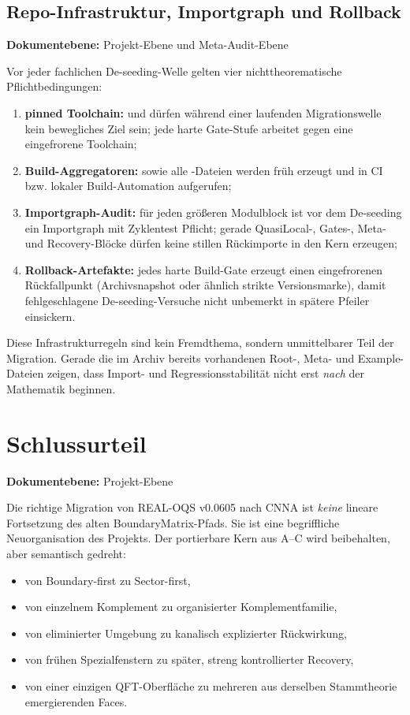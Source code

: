 \documentclass[11pt,a4paper]{article}
\let\oldpath\path
\renewcommand{\path}[1]{\oldpath{#1}}
\newcommand{\doclevel}[1]{\par\small\noindent\textbf{Dokumentebene:} #1\par\normalsize\medskip}
\begin{document}
\subsection{Repo-Infrastruktur, Importgraph und Rollback}
\doclevel{Projekt-Ebene und Meta-Audit-Ebene}
Vor jeder fachlichen De-seeding-Welle gelten vier nichttheorematische Pflichtbedingungen:

\begin{enumerate}
\item \textbf{pinned Toolchain:}  und  dürfen während einer
laufenden Migrationswelle kein bewegliches Ziel sein; jede harte Gate-Stufe arbeitet gegen eine
eingefrorene Toolchain;
\item \textbf{Build-Aggregatoren:}  sowie alle
-Dateien werden früh erzeugt und in CI bzw. lokaler
Build-Automation aufgerufen;
\item \textbf{Importgraph-Audit:} für jeden größeren Modulblock ist vor dem De-seeding ein
Importgraph mit Zyklentest Pflicht; gerade QuasiLocal-, Gates-, Meta- und Recovery-Blöcke dürfen
keine stillen Rückimporte in den Kern erzeugen;
\item \textbf{Rollback-Artefakte:} jedes harte Build-Gate erzeugt einen eingefrorenen Rückfallpunkt
(Archivsnapshot oder ähnlich strikte Versionsmarke), damit fehlgeschlagene De-seeding-Versuche nicht
unbemerkt in spätere Pfeiler einsickern.
\end{enumerate}

Diese Infrastrukturregeln sind kein Fremdthema, sondern unmittelbarer Teil der Migration. Gerade die
im Archiv bereits vorhandenen Root-, Meta- und Example-Dateien zeigen, dass Import- und
Regressionsstabilität nicht erst \emph{nach} der Mathematik beginnen.



\newpage
\section{Schlussurteil}
\doclevel{Projekt-Ebene}

Die richtige Migration von REAL-OQS v0.0605 nach CNNA ist \emph{keine} lineare Fortsetzung des alten
BoundaryMatrix-Pfads. Sie ist eine begriffliche Neuorganisation des Projekts. Der portierbare Kern aus
A--C wird beibehalten, aber semantisch gedreht:
\begin{itemize}
\item von Boundary-first zu Sector-first,
\item von einzelnem Komplement zu organisierter Komplementfamilie,
\item von eliminierter Umgebung zu kanalisch explizierter Rückwirkung,
\item von frühen Spezialfenstern zu später, streng kontrollierter Recovery,
\item von einer einzigen QFT-Oberfläche zu mehreren aus derselben Stammtheorie emergierenden Faces.
\end{itemize}
\end{document}
